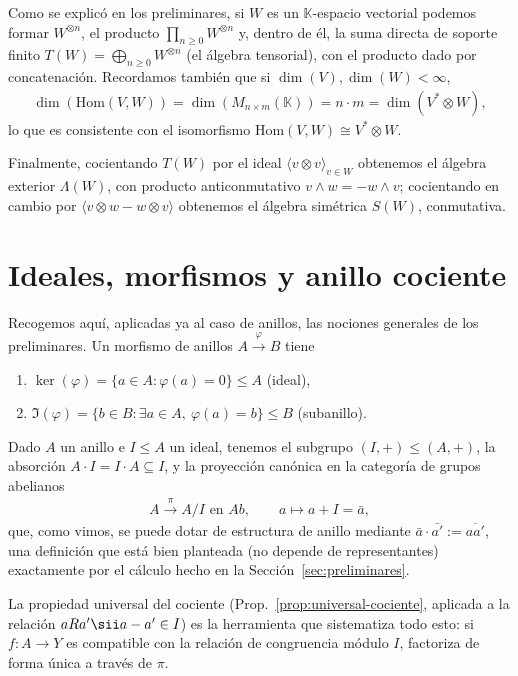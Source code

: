 Como se explicó en los preliminares, si $W$ es un $\mathbb{K}$-espacio vectorial podemos formar $W^{\otimes n}$, el producto $\prod_{n\geq 0} W^{\otimes n}$ y, dentro de él, la suma directa de soporte finito $T(W)=\bigoplus_{n\geq 0} W^{\otimes n}$ (el álgebra tensorial), con el producto dado por concatenación. Recordamos también que si $\dim(V),\dim(W)<\infty$,
\begin{gather*}
    \dim(\mathrm{Hom}(V,W)) = \dim(M_{n\times m}(\mathbb{K})) = n\cdot m = \dim(V^*\otimes W),
\end{gather*}
lo que es consistente con el isomorfismo $\mathrm{Hom}(V,W)\cong V^*\otimes W$.

Finalmente, cocientando $T(W)$ por el ideal $\langle v\otimes v\rangle_{v\in W}$ obtenemos el álgebra exterior $\Lambda(W)$, con producto anticonmutativo $v\wedge w=-w\wedge v$; cocientando en cambio por $\langle v\otimes w - w\otimes v\rangle$ obtenemos el álgebra simétrica $S(W)$, conmutativa.

\section{Ideales, morfismos y anillo cociente}

Recogemos aquí, aplicadas ya al caso de anillos, las nociones generales de los preliminares. Un morfismo de anillos $A\xrightarrow{\varphi} B$ tiene
\begin{enumerate}
    \item $\ker(\varphi) = \{a \in A : \varphi(a) = 0\} \leq A$ (ideal),
    \item $\Im(\varphi) = \{b\in B : \exists a \in A,\ \varphi(a) = b\} \leq B$ (subanillo).
\end{enumerate}
Dado $A$ un anillo e $I\leq A$ un ideal, tenemos el subgrupo $(I,+) \leq (A,+)$, la absorción $A \cdot I = I \cdot A \subseteq I$, y la proyección canónica en la categoría de grupos abelianos
\begin{gather*}
    A \xrightarrow{\pi} A/I \text{ en } Ab, \qquad a \mapsto a + I = \bar{a},
\end{gather*}
que, como vimos, se puede dotar de estructura de anillo mediante $\bar{a} \cdot \bar{a'} := \overline{aa'}$, una definición que está bien planteada (no depende de representantes) exactamente por el cálculo hecho en la Sección~\ref{sec:preliminares}.

La propiedad universal del cociente (Prop.~\ref{prop:universal-cociente}, aplicada a la relación $aRa'\sii a-a'\in I$) es la herramienta que sistematiza todo esto: si $f:A\to Y$ es compatible con la relación de congruencia módulo $I$, factoriza de forma única a través de $\pi$.

